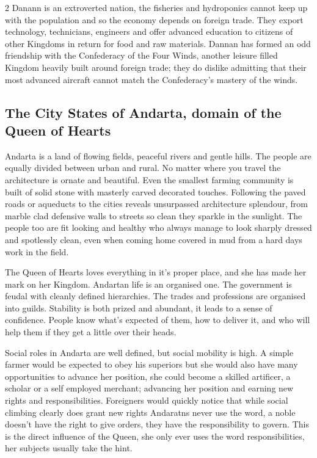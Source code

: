 \begin{multicols}{2}
Danann is an extroverted nation, the fisheries and hydroponics cannot keep up with the population and so the economy depends on foreign trade. They export technology, technicians, engineers and offer advanced education to citizens of other Kingdoms in return for food and raw materials. Dannan has formed an odd friendship with the Confederacy of the Four Winds, another leisure filled Kingdom heavily built around foreign trade; they do dislike admitting that their most advanced aircraft cannot match the Confederacy’s mastery of the winds. 

\subsection*{The City States of Andarta, domain of the Queen of Hearts}

Andarta is a land of flowing fields, peaceful rivers and gentle hills. The people are equally divided between urban and rural. No matter where you travel the architecture is ornate and beautiful. Even the smallest farming community is built of solid stone with masterly carved decorated touches. Following the paved roads or aqueducts to the cities reveals unsurpassed architecture splendour, from marble clad defensive walls to streets so clean they sparkle in the sunlight. The people too are fit looking and healthy who always manage to look sharply dressed and spotlessly clean, even when coming home covered in mud from a hard days work in the field.

The Queen of Hearts loves everything in it's proper place, and she has made her mark on her Kingdom. Andartan life is an organised one. The government is feudal with cleanly defined hierarchies. The trades and professions are organised into guilds. Stability is both prized and abundant, it leads to a sense of confidence. People know what's expected of them, how to deliver it, and who will help them if they get a little over their heads.

Social roles in Andarta are well defined, but social mobility is high. A simple farmer would be expected to obey his superiors but she would also have many opportunities to advance her position, she could become a skilled artificer, a scholar or a self employed merchant; advancing her position and earning new rights and responsibilities. Foreigners would quickly notice that while social climbing clearly does grant new rights Andaratns never use the word, a noble doesn’t have the right to give orders, they have the responsibility to govern. This is the direct influence of the Queen, she only ever uses the word responsibilities, her subjects usually take the hint.


\end{multicols}
